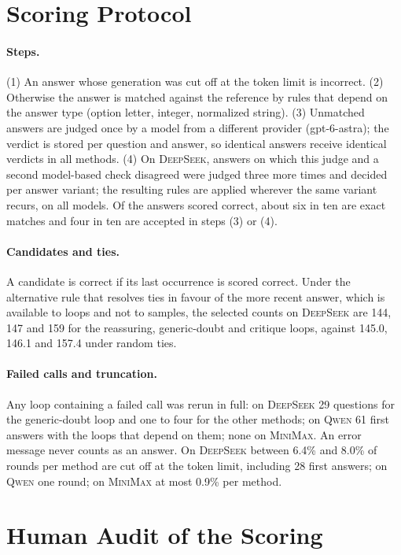 \documentclass[11pt]{article}
\newcommand{\ds}{\textsc{DeepSeek}}
\newcommand{\qw}{\textsc{Qwen}}
\newcommand{\mm}{\textsc{MiniMax}}
\begin{document}
\section{Scoring Protocol}
\label{app:scoring}

\paragraph{Steps.}
(1) An answer whose generation was cut off at the token limit is incorrect.
(2) Otherwise the answer is matched against the reference by rules that depend on the answer type (option letter, integer, normalized string).
(3) Unmatched answers are judged once by a model from a different provider (gpt-6-astra); the verdict is stored per question and answer, so identical answers receive identical verdicts in all methods.
(4) On \ds, answers on which this judge and a second model-based check disagreed were judged three more times and decided per answer variant; the resulting rules are applied wherever the same variant recurs, on all models.
Of the answers scored correct, about six in ten are exact matches and four in ten are accepted in steps (3) or (4).

\paragraph{Candidates and ties.}
A candidate is correct if its last occurrence is scored correct.
Under the alternative rule that resolves ties in favour of the more recent answer, which is available to loops and not to samples, the selected counts on \ds{} are 144, 147 and 159 for the reassuring, generic-doubt and critique loops, against 145.0, 146.1 and 157.4 under random ties.

\paragraph{Failed calls and truncation.}
Any loop containing a failed call was rerun in full: on \ds{} 29 questions for the generic-doubt loop and one to four for the other methods; on \qw{} 61 first answers with the loops that depend on them; none on \mm.
An error message never counts as an answer.
On \ds{} between 6.4\% and 8.0\% of rounds per method are cut off at the token limit, including 28 first answers; on \qw{} one round; on \mm{} at most 0.9\% per method.

\section{Human Audit of the Scoring}
\label{app:audit}
\end{document}

